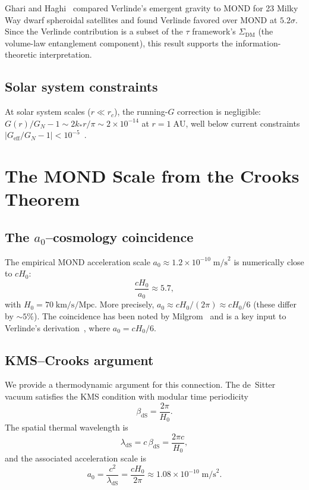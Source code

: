 \documentclass[prd,twocolumn,superscriptaddress,longbibliography,floatfix]{revtex4-2}
\newcommand{\tauasym}{\tau}
\begin{document}
Ghari and Haghi~\cite{GhariHaghi2026} compared Verlinde's
emergent gravity to MOND for 23 Milky Way dwarf spheroidal
satellites and found Verlinde favored over MOND at
$5.2\sigma$.  Since the Verlinde contribution is a subset
of the $\tauasym$ framework's $\Sigma_{\mathrm{DM}}$ (the
volume-law entanglement component), this result supports the
information-theoretic interpretation.

\subsection{Solar system constraints}

At solar system scales ($r \ll r_c$), the running-$G$
correction is negligible: $G(r)/G_N - 1 \sim 2k_* r/\pi
\sim 2 \times 10^{-14}$ at $r = 1\;\mathrm{AU}$, well
below current constraints
$|G_{\mathrm{eff}}/G_N - 1| < 10^{-5}$~\cite{Will2014}.

\section{The MOND Scale from the Crooks Theorem}
\label{sec:a0}

\subsection{The $a_0$--cosmology coincidence}

The empirical MOND acceleration scale
$a_0 \approx 1.2 \times 10^{-10}\;\mathrm{m/s}^2$ is
numerically close to $cH_0$:
\begin{equation}
\frac{cH_0}{a_0} \approx 5.7,
\end{equation}
with $H_0 = 70\;\mathrm{km/s/Mpc}$.  More precisely,
$a_0 \approx cH_0/(2\pi) \approx cH_0/6$
(these differ by $\sim\!5\%$).  The coincidence has been
noted by Milgrom~\cite{Milgrom2020} and is a key input to
Verlinde's derivation~\cite{Verlinde2016}, where
$a_0 = cH_0/6$.

\subsection{KMS--Crooks argument}

We provide a thermodynamic argument for this connection.
The de~Sitter vacuum satisfies the KMS condition with modular
time periodicity
\begin{equation}
\beta_{\mathrm{dS}} = \frac{2\pi}{H_0}.
\label{eq:beta_dS}
\end{equation}
The spatial thermal wavelength is
\begin{equation}
\lambda_{\mathrm{dS}} = c\,\beta_{\mathrm{dS}} =
\frac{2\pi c}{H_0},
\label{eq:lambda_dS}
\end{equation}
and the associated acceleration scale is
\begin{equation}
a_0 = \frac{c^2}{\lambda_{\mathrm{dS}}} =
\frac{cH_0}{2\pi} \approx 1.08 \times 10^{-10}\;
\mathrm{m/s}^2.
\label{eq:a0}
\end{equation}
\end{document}
